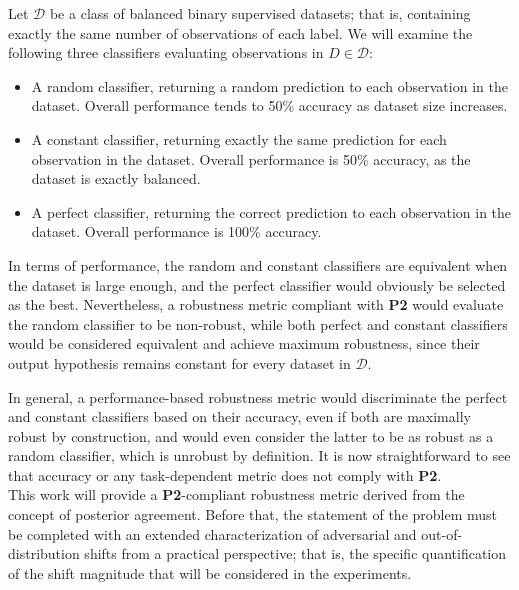 \begin{example}
    Let $\mathcal{D}$ be a class of balanced binary supervised datasets; that is,
    containing exactly the same number of observations of each 
    label. We will examine the following 
    three classifiers evaluating observations in $D \in \mathcal{D}$:

    \begin{itemize}
        \item A random classifier, returning
        a random prediction to each observation in the dataset. Overall performance 
        tends to 50\% accuracy as dataset size increases. 
        \item A constant classifier, returning exactly the same
        prediction for each observation in the dataset. Overall performance is 50\% accuracy,
        as the dataset is exactly balanced.
        \item A perfect classifier, returning the correct prediction
        to each observation in the dataset. Overall performance is 100\% accuracy. 
    \end{itemize}

    In terms of performance, the random and constant classifiers are equivalent when
    the dataset is large enough, and the perfect classifier would obviously be selected as the best.
    Nevertheless, a robustness metric compliant with \textbf{P2} would
    evaluate the random classifier to be non-robust, while both perfect and
    constant classifiers would be considered equivalent and achieve
    maximum robustness, since their output hypothesis remains constant for 
    every dataset in $\mathcal{D}$.
\end{example}

In general, a performance-based robustness metric would discriminate the perfect and
constant classifiers based on their accuracy, even if both are maximally robust
by construction, and would even consider the latter to be as robust as 
a random classifier, which is unrobust by definition. It is now straightforward to see 
that accuracy or any task-dependent metric does not comply with \textbf{P2}. \\

This work will provide a \textbf{P2}-compliant robustness metric derived from the
concept of posterior agreement. Before that, the statement of the problem must be 
completed with an extended characterization of adversarial and out-of-distribution 
shifts from a practical perspective; that is, the specific quantification
of the shift magnitude that will be considered in the experiments.

